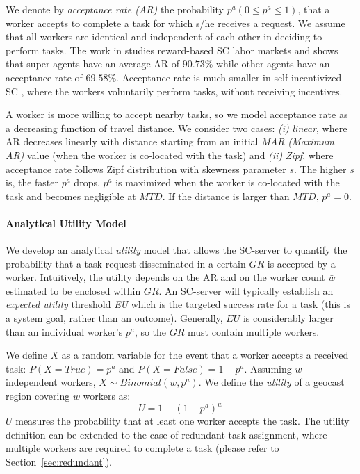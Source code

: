 \documentclass{USC-Thesis}
\numberwithin{equation}{chapter}
\begin{document}
We denote by \textit{acceptance rate (AR)} the probability $p^a (0\le p^a \le 1)$, that a worker accepts to complete a task for which s/he receives a request. We assume that all workers are identical and independent of each other in deciding to perform tasks. The work in \cite{musthag2013labor} studies reward-based SC labor markets and shows that super agents have an average AR of $90.73\%$ while other agents have an acceptance rate of $69.58\%$. Acceptance rate is much smaller in self-incentivized SC \cite{kazemi2012geocrowd}, where the workers voluntarily perform tasks, without receiving incentives.

A worker is more willing to accept nearby tasks, so we model acceptance rate as a decreasing function of travel distance. We consider two cases: {\em (i)} {\em linear}, where AR decreases linearly with distance starting from an initial {\em MAR (Maximum AR)} value (when the worker is co-located with the task) and {\em (ii)} {\em Zipf}, where acceptance rate follows Zipf distribution with skewness parameter $s$.
The higher $s$ is, the faster $p^a$ drops. $p^a$ is maximized when the worker is co-located with the task and becomes negligible at $\mathit{MTD}$. If the distance is larger than $\mathit{MTD}$, $p^a=0$.

\paragraph{Analytical Utility Model}
\label{sec:utility_model}
We develop an analytical {\em utility} model that allows the SC-server to quantify the probability that a task request disseminated in a certain $\mathit{GR}$ is accepted by a worker. Intuitively, the utility depends on the AR and on the worker count $\bar{w}$ estimated to be enclosed within $\mathit{GR}$. An SC-server will typically establish an {\em expected utility} threshold {\em EU} which is the targeted success rate for a task (this is a system goal, rather than an outcome).
Generally, $\mathit{EU}$ is considerably larger than an individual worker's $p^a$, so the $\mathit{GR}$ must contain multiple workers. 

We define $X$ as a random variable for the event that a worker accepts a received task: $\mathit{P(X=True)=p^a}$ and $\mathit{P(X=False)=1-p^a}$. Assuming $w$ independent workers, $\mathit{X\sim Binomial(w,p^a)}$. We define the {\em utility} of a geocast region covering $w$ workers as:
\begin{equation}
\label{eq:utility}
U=1-(1-p^a)^w
\end{equation} 
$U$ measures the probability that at least one worker accepts the task. 
The utility definition can be extended to the case of redundant task assignment, where multiple workers are required to complete a task (please refer to Section~\ref{sec:redundant}).
\end{document}
